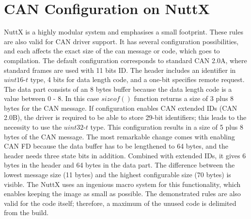 \documentclass{ctuthesis}
\begin{document}
 \section{CAN Configuration on NuttX}
 NuttX is a highly modular system and emphasises a small footprint. These rules are also valid for CAN driver support. It has several configuration possibilities, and each affects the exact size of the can message or code, which goes to compilation. The default configuration corresponds to standard CAN 2.0A, where standard frames are used with 11 bits ID. The header includes an identifier in $uint16\text{-}t$ type, 4 bits for data length code, and a one-bit specifies remote request. The data part consists of an 8 bytes buffer because the data length code is a value between 0 - 8. In this case $sizeof()$ function returns a size of 3 plus 8 bytes for the CAN message. If configuration enables CAN extended IDs (CAN 2.0B), the driver is required to be able to store 29-bit identifiers; this leads to the necessity to use the $uint32\text{-}t$ type. This configuration results in a size of 5 plus 8 bytes of the CAN message. The most remarkable change comes with enabling CAN FD because the data buffer has to be lengthened to 64 bytes, and the header needs three state bits in addition. Combined with extended IDs, it gives 6 bytes in the header and 64 bytes in the data part. The difference between the lowest message size (11 bytes) and the highest configurable size (70 bytes) is visible. The NuttX uses an ingenious macro system for this functionality, which enables keeping the image as small as possible. The demonstrated rules are also valid for the code itself; therefore, a maximum of the unused code is delimited from the build.
\end{document}

